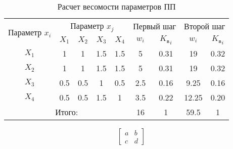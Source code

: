     \begin{table}[ht]
        \caption{Расчет весомости параметров ПП}
        \label{tab_weight}
        \centering
            \begin{tabular}{|c|c|c|c|c|c|c|c|c|}
            \hline \multirow{2}{*}{Параметр $x_i$} & \multicolumn{4}{c|}{Параметр $x_j$} & 
                \multicolumn{2}{c|}{Первый шаг} & \multicolumn{2}{c|}{Второй шаг} \\
            \cline{2-9} & $X_1$ & $X_2$ & $X_3$ & $X_4$ & $w_i$ & 
                ${K_\text{в}}_i$ & $w_i$ & ${K_\text{в}}_i$ \\
            \hline $X_1$ & 1 & 1 & 1.5 & 1.5 & 5 & 0.31 & 19 & 0.32 \\
            \hline $X_2$ & 1 & 1 & 1.5 & 1.5 & 5 & 0.31 & 19 & 0.32 \\
            \hline $X_3$ & 0.5 & 0.5 & 1 & 0.5 & 2.5 & 0.16 & 9.25 & 0.16 \\
            \hline $X_4$ & 0.5 & 0.5 & 1.5 & 1 & 3.5 & 0.22 & 12.25 & 0.20 \\
            \hline \multicolumn{5}{|c|}{Итого:} & 16 & 1 & 59.5 & 1 \\
            \hline
            \end{tabular}
    \end{table}

    \begin{equation}
        \begin{bmatrix}
            a & b \\ c & d
        \end{bmatrix}
    \end{equation}
    
    


        